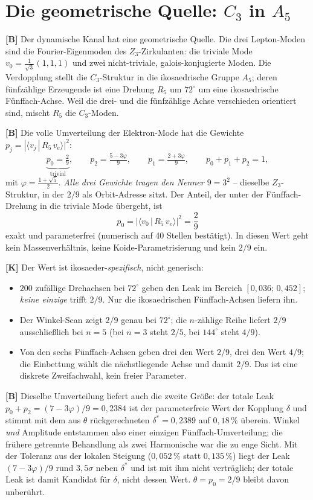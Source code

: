 \section{Die geometrische Quelle: $C_3$ in $A_5$}

\textbf{[B]} Der dynamische Kanal hat eine geometrische Quelle. Die drei
Lepton-Moden sind die Fourier-Eigenmoden des $Z_3$-Zirkulanten: die triviale
Mode $v_0 = \tfrac{1}{\sqrt3}(1,1,1)$ und zwei nicht-triviale, galois-konjugierte
Moden. Die Verdopplung stellt die $C_3$-Struktur in die ikosaedrische Gruppe
$A_5$; deren fünfzählige Erzeugende ist eine Drehung $R_5$ um $72^\circ$ um eine
ikosaedrische Fünffach-Achse. Weil die drei- und die fünfzählige Achse
verschieden orientiert sind, mischt $R_5$ die $C_3$-Moden.

\textbf{[B]} Die volle Umverteilung der Elektron-Mode hat die Gewichte
$p_j = |\langle v_j\,|\,R_5\,v_e\rangle|^2$:
\[
  \underbrace{p_0 = \tfrac29}_{\text{trivial}},\qquad
  p_2 = \tfrac{5-3\varphi}{9},\qquad
  p_1 = \tfrac{2+3\varphi}{9},\qquad
  p_0+p_1+p_2 = 1,
\]
mit $\varphi = \tfrac{1+\sqrt5}{2}$. \emph{Alle drei Gewichte tragen den Nenner
$9 = 3^2$} -- dieselbe $Z_3$-Struktur, in der $2/9$ als Orbit-Adresse sitzt. Der
Anteil, der unter der Fünffach-Drehung in die triviale Mode übergeht, ist
\[
  p_0 = \bigl|\langle v_0\,|\,R_5\,v_e\rangle\bigr|^2 = \frac29
\]
exakt und parameterfrei (numerisch auf 40 Stellen bestätigt). In diesen Wert
geht kein Massenverhältnis, keine Koide-Parametrisierung und kein $2/9$ ein.

\textbf{[K]} Der Wert ist ikosaeder-\emph{spezifisch}, nicht generisch:
\begin{itemize}
  \item $200$ zufällige Drehachsen bei $72^\circ$ geben den Leak im Bereich
    $[0{,}036;\,0{,}452]$; \emph{keine einzige} trifft $2/9$. Nur die
    ikosaedrischen Fünffach-Achsen liefern ihn.
  \item Der Winkel-Scan zeigt $2/9$ genau bei $72^\circ$; die $n$-zählige Reihe
    liefert $2/9$ ausschließlich bei $n = 5$ (bei $n=3$ steht $2/5$, bei
    $144^\circ$ steht $4/9$).
  \item Von den sechs Fünffach-Achsen geben drei den Wert $2/9$, drei den Wert
    $4/9$; die Einbettung wählt die nächstliegende Achse und damit $2/9$. Das ist
    eine diskrete Zweifachwahl, kein freier Parameter.
\end{itemize}

\textbf{[B]} Dieselbe Umverteilung liefert auch die zweite Größe: der totale
Leak $p_0 + p_2 = (7-3\varphi)/9 = 0{,}2384$ ist der parameterfreie Wert der
Kopplung $\delta$ und stimmt mit dem aus $\theta$ rückgerechneten
$\delta^* = 0{,}2389$ auf $0{,}18\,\%$ überein. Winkel \emph{und} Amplitude
entstammen also einer einzigen Fünffach-Umverteilung; die frühere getrennte
Behandlung als zwei Harmonische war die zu enge Sicht.
Mit der Toleranz aus der lokalen Steigung ($0{,}052\,\%$ statt $0{,}135\,\%$) liegt der Leak $(7-3\varphi)/9$ rund $3{,}5\sigma$ neben $\delta^*$ und ist mit ihm nicht verträglich; der totale Leak ist damit Kandidat für $\delta$, nicht dessen Wert. $\theta=p_0=2/9$ bleibt davon unberührt.

